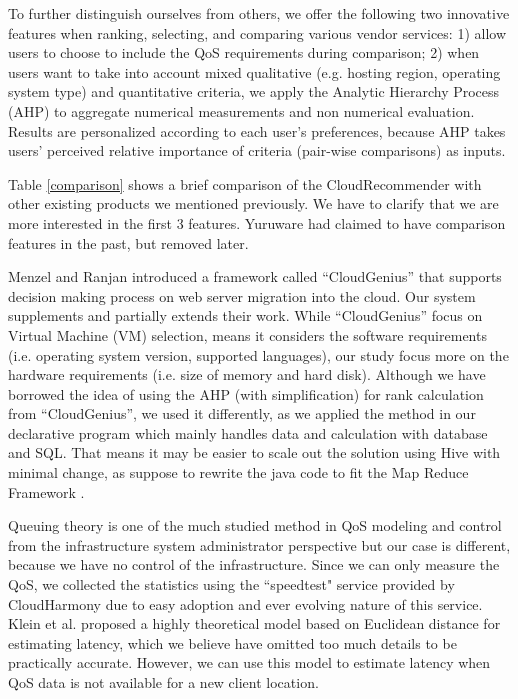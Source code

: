 \documentclass[journal]{IEEEtran}
\begin{document}
To further distinguish ourselves from others, we offer the following two innovative features when ranking, selecting, and comparing various vendor services: 1) allow users to choose to include the QoS requirements during comparison; 2) when users want to take into account mixed qualitative (e.g. hosting region, operating system type) and quantitative criteria, we apply the Analytic Hierarchy Process (AHP) to aggregate numerical measurements and non numerical evaluation. Results are personalized according to each user's preferences, because AHP takes users' perceived relative importance of criteria (pair-wise comparisons) as inputs.

Table \ref{comparison} shows a brief comparison of the CloudRecommender with other existing products we mentioned previously. We have to clarify that we are more interested in the first 3 features. Yuruware had claimed to have comparison features in the past, but removed later.

Menzel and Ranjan    \cite{menzel2012cloudgenius} introduced a framework called ``CloudGenius'' that supports decision making process on web server migration into the cloud. Our system supplements and partially extends their work. While ``CloudGenius'' focus on Virtual Machine (VM) selection, means it considers the software requirements (i.e. operating system version, supported languages), our study focus more on the hardware requirements (i.e. size of memory and hard disk).  Although we have borrowed the idea of using the AHP (with simplification) for rank calculation from ``CloudGenius'', we used it differently, as we applied the method in our declarative program which mainly handles data and calculation with database and SQL. That means it may be easier to scale out the solution using Hive \cite{ref29} with minimal change, as suppose to rewrite the java code to fit the Map Reduce Framework    \cite{dean2008mapreduce}.


Queuing theory is one of the much studied method in QoS modeling and control from the infrastructure system administrator perspective    \cite{sha2002queueing} but our case is different, because we have no control of the infrastructure. Since we can only measure the QoS, we collected the statistics using the ``speedtest"  service provided by CloudHarmony due to easy adoption and ever evolving nature of this service. Klein et al.    \cite{klein2012towards} proposed a highly theoretical model based on Euclidean distance for estimating latency, which we believe have omitted too much details to be practically accurate. However, we can use this model to estimate latency when QoS data is not available for a new client location.
\end{document}
